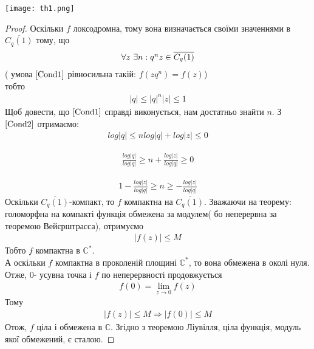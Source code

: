 \documentclass[12pt,a4paper]{article}
\begin{document}
\texttt{[image: th1.png]}
\begin{proof}
Оскільки $f$ локсодромна, тому вона визначається своїми значеннями в $\overline{C_{q}(1)}$ тому, що 
\begin{equation}\label{Cond1}
\begin{array}{l}
 \forall z $ $\exists n: q^{n}z \in \overline{C_{q}(1)} 
\end{array}
\end{equation} 
( умова $\eqref{Cond1}$ рівносильна такій: $f(zq^{n})=f(z)$)\\
тобто
\begin{equation}\label{Cond2}
\begin{array}{l}
\vert q \vert \leq \vert q\vert ^{n} \vert z\vert \leq 1                       
\end{array}
\end{equation}
Щоб довести, що $\eqref{Cond1}$ справді виконується, нам достатньо знайти $n$. З $\eqref{Cond2}$ отримаємо:
\[\begin{array}{l}
log\vert q \vert \leq n log\vert q\vert +log \vert z\vert \leq 0                       
\end{array}\]

\[\begin{array}{l}
\frac {log\vert q \vert }{log\vert q\vert} \geq n  + \frac{ log \vert z\vert}{log\vert q\vert} \geq 0                       
\end{array}\]

\[\begin{array}{l}
1- \frac{ log \vert z\vert}{log\vert q\vert} \geq n  \geq -\frac{ log \vert z\vert}{log\vert q\vert} 
\end{array}\]
Оскільки $\overline{C_{q}(1)}$-компакт, то $f$ компактна на $\overline{C_{q}(1)}$. Зважаючи на теорему: голоморфна на компакті функція обмежена за модулем( бо неперервна за теоремою Вейєрштрасса), отримуємо
\[\begin{array}{l}
  \vert f(z) \vert\leq M
\end{array}\]
Тобто $f$ компактна в $\mathbb{C}^{*}$. \\
А оскільки $f$ компактна в проколеній площині $\mathbb{C}^{*}$, то вона обмежена в околі нуля. Отже, $0$- усувна точка і $f$ по неперервності продовжується
\[\begin{array}{l}
  f(0)=\lim\limits_{z\rightarrow 0} f(z)
\end{array}\]
Тому 
\[\begin{array}{l}
  \vert f(z) \vert\leq M \Longrightarrow \vert f(0) \vert\leq M
\end{array}\]
Отож, $f$ ціла і обмежена в $\mathbb{C}$. Згідно з теоремою Ліувілля, ціла функція, модуль якої обмежений, є сталою.
\end{proof}
\[\begin{array}{l}
\end{array} \]
\end{document}
